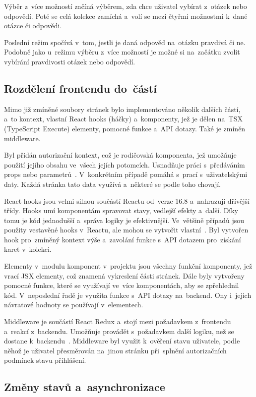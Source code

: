 \documentclass[twoside]{ctuthesis}
\begin{document}
Výběr z~více možností začíná výběrem, zda chce uživatel vybírat z~otázek nebo odpovědí. Poté se celá kolekce zamíchá a~volí se mezi čtyřmi možnostmi k~dané otázce či odpovědi.

Poslední režim spočívá v~tom, jestli je daná odpověď na~otázku pravdivá či ne. Podobně jako u~režimu výběru z~více možností je možné si na~začátku zvolit vybírání pravdivosti otázek nebo odpovědí. 

\subsection{Rozdělení frontendu do~částí}

Mimo již zmíněné soubory stránek bylo implementováno několik dalších částí, a~to kontext, vlastní React hooks (háčky) a~komponenty, jež je dělen na~TSX (TypeScript Execute) elementy, pomocné funkce a~API dotazy. Také je zmíněn middleware.

Byl přidán autorizační kontext, což je rodičovská komponenta, jež umožňuje použití jejího obsahu ve~všech jejích potomcích. Usnadňuje práci s~předáváním props nebo parametrů~\cite{context}. V~konkrétním případě pomáhá s~prací s~uživatelskými daty. Každá stránka tato data využívá a~některé se podle toho chovají.

React hooks jsou velmi silnou součástí Reactu od~verze 16.8 a~nahrazují dřívější třídy. Hooks umí komponentám spravovat stavy, vedlejší efekty a~další. Díky tomu je kód jednodušší a~správa logiky je efektivnější. Ve~většině případů jsou použity vestavěné hooks v~Reactu, ale mohou se vytvořit vlastní~\cite{hooks}. Byl vytvořen hook pro~zmíněný kontext výše a~zavolání funkce s~API dotazem pro~získání karet v~kolekci.

Elementy v~modulu komponent v~projektu jsou všechny funkční komponenty, jež vrací JSX elementy, což znamená vykreslení části stránek. Dále byly vytvořeny pomocné funkce, které se využívají ve~více komponentách, aby se zpřehlednil kód. V~neposlední řadě je využita funkce s~API dotazy na~backend. Ony i~jejich návratové hodnoty se používají v~elementech.

Middleware je součástí React Redux a~stojí mezi požadavkem z~frontendu a~reakcí z~backendu. Umožňuje provádět s~požadavkem další logiku, než se dostane k~backendu~\cite{middleware}. Middleware byl využit k~ověření stavu uživatele, podle něhož je uživatel přesměrován na~jinou stránku při~splnění autorizačních podmínek stavu přihlášení.

\subsection{Změny stavů a~asynchronizace}
\end{document}
